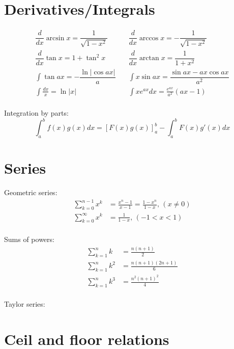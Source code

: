 \section{Derivatives/Integrals}
\begin{align*}
\dfrac{d}{dx}\arcsin x = \dfrac{1}{\sqrt{1-x^2}} & \quad
\dfrac{d}{dx}\arccos x = -\dfrac{1}{\sqrt{1-x^2}}\\
\dfrac{d}{dx}\tan x = 1+\tan^2 x & \quad
\dfrac{d}{dx}\arctan x = \dfrac{1}{1+x^2}\\
\int\tan ax = -\dfrac{\ln|\cos ax|}{a} & \quad
\int x\sin ax = \dfrac{\sin ax-ax \cos ax}{a^2}\\
\int \frac{dx}{x} = \ln|x| & \quad
\int xe^{ax}dx = \frac{e^{ax}}{a^2}(ax-1)\\
\end{align*}

Integration by parts:
$$\int_a^bf(x)g(x)dx = [F(x)g(x)]_a^b-\int_a^bF(x)g'(x)dx$$

\section{Series} 
Geometric series:
\begin{align*}
\sum_{k=0}^{n-1}x^k &= \frac{x^n-1}{x-1} = \frac{1-x^n}{1-x},\,(x\neq0)\\
\sum_{k=0}^{\infty}x^k &= \frac{1}{1-x},\,(-1<x<1)\\
\end{align*}

Sums of powers:
\begin{align*}
\sum_{k=1}^n k &= \frac{n(n+1)}{2}\\
\sum_{k=1}^n k^2 &= \frac{n(n+1)(2n+1)}{6}\\
\sum_{k=1}^n k^3 &= \frac{n^2(n+1)^2}{4}\\
\end{align*}

Taylor series:

\section{Ceil and floor relations}


